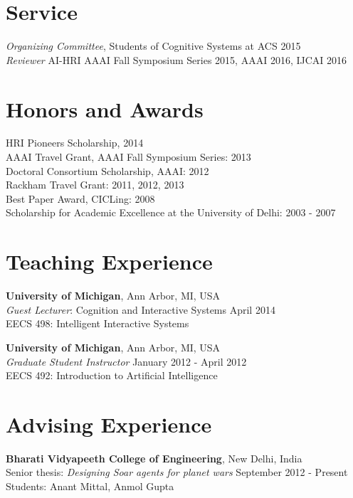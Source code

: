 \documentclass[margin,line,11pt]{res}
\begin{document}
\begin{resume}
                  \section{\sc Service}
                  \emph{Organizing Committee}, Students of Cognitive Systems at ACS \hfill 2015\\
                  \emph{Reviewer} AI-HRI AAAI Fall Symposium Series 2015, AAAI 2016, IJCAI 2016


                  \section{\sc Honors and Awards} 
                  HRI Pioneers Scholarship, 2014\\
                  AAAI Travel Grant, AAAI Fall Symposium Series: 2013\\
                  Doctoral Consortium Scholarship, AAAI: 2012 \\
                  Rackham Travel Grant: 2011, 2012, 2013 \\
                  Best Paper Award, CICLing: 2008 \\
                  Scholarship for Academic Excellence at the University of Delhi: 2003 - 2007 

                  \section{\sc Teaching Experience}
                  \textbf{University of Michigan}, Ann Arbor, MI, USA
                  \\ \emph{Guest Lecturer}: Cognition and Interactive
                  Systems \hfill April 2014 \\ EECS 498: Intelligent
                  Interactive Systems

                  \textbf{University of Michigan}, Ann Arbor, MI, USA \\
                  \emph{Graduate Student Instructor} \hfill January 2012 - April 2012 \\
                  EECS 492: Introduction to Artificial Intelligence

                  \section{\sc Advising Experience}
                  \textbf{Bharati Vidyapeeth College of Engineering}, New Delhi, India\\
                  Senior thesis: \emph{Designing Soar agents for planet wars} \hfill September 2012 - Present\\
                  Students: Anant Mittal, Anmol Gupta


\end{resume}
\end{document}
